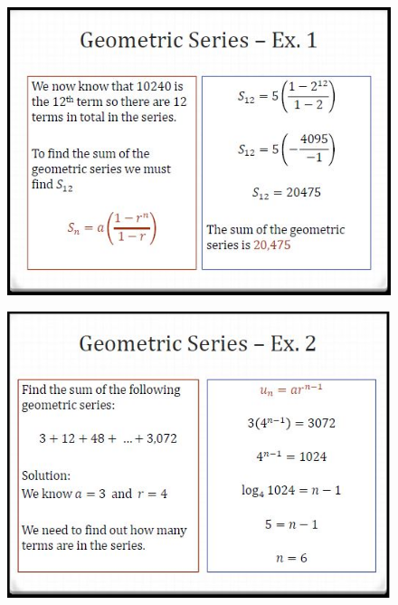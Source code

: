 \documentclass{beamer}
\begin{document}
\begin{frame}
	\begin{figure}
		\centering
		\includegraphics[width=0.99\linewidth]{SeqSer19E}
	\end{figure}
	
\end{frame}	
\begin{frame}
	\begin{figure}
		\centering
		\includegraphics[width=0.99\linewidth]{SeqSer19F}
	\end{figure}
	
\end{frame}
\end{document}
